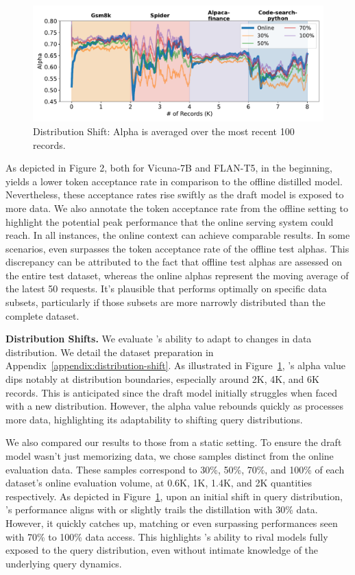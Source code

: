 \begin{figure}      
\vspace{-10pt}
    \centering
    \includegraphics[width=0.75\linewidth]{figures/sharp.pdf}
    \vspace{-15pt}
    \caption{Distribution Shift: Alpha is averaged over the most recent 100 records.}
    \vspace{-15pt}
    \label{fig:dis-shift}
\end{figure}


As depicted in Figure 2, both for Vicuna-7B and FLAN-T5, in the beginning, \tool yields a lower token acceptance rate in comparison to the offline distilled model. Nevertheless, these acceptance rates rise swiftly as the draft model is exposed to more data. We also annotate the token acceptance rate from the offline setting to highlight the potential peak performance that the online serving system could reach. 
In all instances, the online context can achieve comparable results. In some scenarios, \tool even surpasses the token acceptance rate of the offline test alphas. This discrepancy can be attributed to the fact that offline test alphas are assessed on the entire test dataset, whereas the online alphas represent the moving average of the latest 50 requests. It's plausible that \tool performs optimally on specific data subsets, particularly if those subsets are more narrowly distributed than the complete dataset.

{\bf Distribution Shifts.} 
We evaluate \tool's ability to adapt to changes in data distribution. 
We detail the dataset preparation in Appendix~\ref{appendix:distribution-shift}. 
As illustrated in Figure~\ref{fig:dis-shift}, \tool's alpha value dips notably at distribution boundaries, especially around 2K, 4K, and 6K records. 
This is anticipated since the draft model initially struggles when faced with a new distribution. However, the alpha value rebounds quickly as \tool processes more data, highlighting its adaptability to shifting query distributions.

We also compared our results to those from a static setting. To ensure the draft model wasn't just memorizing data, we chose samples distinct from the online evaluation data. These samples correspond to 30\%, 50\%, 70\%, and 100\% of each dataset's online evaluation volume, at 0.6K, 1K, 1.4K, and 2K quantities respectively. As depicted in Figure~\ref{fig:dis-shift}, upon an initial shift in query distribution, \tool's performance aligns with or slightly trails the distillation with 30\% data. However, it quickly catches up, matching or even surpassing performances seen with 70\% to 100\% data access. This highlights \tool's ability to rival models fully exposed to the query distribution, even without intimate knowledge of the underlying query dynamics.


